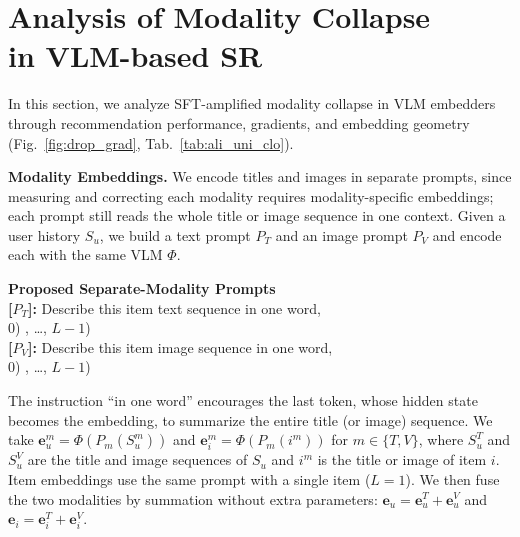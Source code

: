 \section{Analysis of Modality Collapse\\in VLM-based SR}
\label{sec:empirical}

In this section, we analyze SFT-amplified modality collapse in VLM embedders through recommendation performance, gradients, and embedding geometry (Fig.~\ref{fig:drop_grad}, Tab.~\ref{tab:ali_uni_clo}).



\vspace{+0.1cm}
\noindent\textbf{Modality Embeddings.}
\label{sec:prompt_templates}
We encode titles and images in separate prompts, since measuring and correcting each modality requires modality-specific embeddings; each prompt still reads the whole title or image sequence in one context.
Given a user history $S_u$, we build a text prompt $P_T$ and an image prompt $P_V$ and encode each with the same VLM $\Phi$.
\begin{tcolorbox}[colback=gray!5, colframe=gray!50, arc=1mm, boxrule=0.5pt, width=\linewidth, left=6pt, right=6pt, top=3pt, bottom=3pt]
    {\normalsize \textbf{Proposed Separate-Modality Prompts}} \\
    {
    \textbf{[$P_T$]:} Describe this item text sequence in one word, \\
    0) , \dots, $L{-}1$)  \\[2pt]
    \textbf{[$P_V$]:} Describe this item image sequence in one word, \\
    0) , \dots, $L{-}1$) 
    }
\end{tcolorbox}
\noindent The instruction ``in one word'' encourages the last token, whose hidden state becomes the embedding, to summarize the entire title (or image) sequence.
We take $\mathbf{e}_u^m=\Phi(P_m(S_u^m))$ and $\mathbf{e}_i^m=\Phi(P_m(i^m))$ for $m\in\{T,V\}$, where $S_u^T$ and $S_u^V$ are the title and image sequences of $S_u$ and $i^m$ is the title or image of item $i$.
Item embeddings use the same prompt with a single item ($L{=}1$).
We then fuse the two modalities by summation without extra parameters: $\mathbf{e}_u=\mathbf{e}_u^T+\mathbf{e}_u^V$ and $\mathbf{e}_i=\mathbf{e}_i^T+\mathbf{e}_i^V$.

